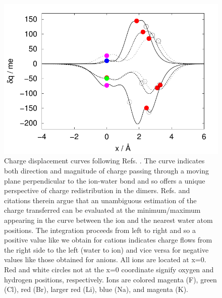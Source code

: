 \begin{sie}
\begin{figure}
 \begin{center}
  \includegraphics[width=0.98\linewidth]{images/ct_main/belpassi.pdf}
 \end{center}
 \caption[Charge displacement curves for ion/water dimers]{\label{fig:belpassi}Charge displacement curves following Refs. \cite{belpassi2009cd1,belpassi2010cd2}. 
  The curve indicates both direction and magnitude of charge passing through a moving plane perpendicular to the ion-water bond and so offers a unique
  perspective of charge redistribution in the dimers. Refs. \cite{belpassi2009cd1,belpassi2010cd2} and citations therein argue that an unambiguous 
  estimation of the charge transferred can be evaluated at the minimum/maximum appearing in the curve between the ion and the nearest water atom positions.
  The integration proceeds from left to right and so a positive value like we obtain for cations indicates charge flows from the right side to the 
  left (water to ion) and vice versa for negative values like those obtained for anions. All ions are located at x=0. Red and white circles not at
  the x=0 coordinate signify oxygen and hydrogen positions, respectively. Ions are colored magenta (F\sur{-}), green (Cl\sur{-}), red (Br\sur{-}), 
  larger red (Li\sur{+}), blue (Na\sur{+}), and magenta (K\sur{+}).}
\end{figure}
  

\end{sie}
